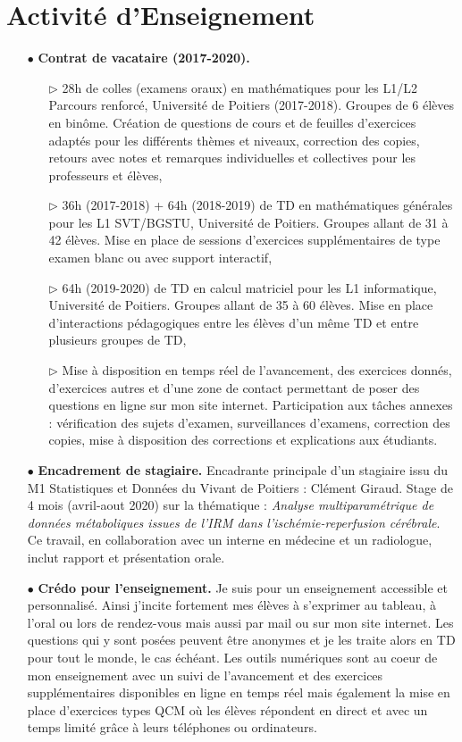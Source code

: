 \documentclass[a4paper, 12pt, twoside, openright]{article}
\begin{document}
\newpage
\section{Activité d'Enseignement}\label{ens}
\begin{itemize}
\item[\color{MagSombre}$\bullet$] \textbf{\color{MagSombre}Contrat de vacataire (2017-2020).}
\begin{itemize}
\item[$\triangleright$] 28h de colles (examens oraux) en mathématiques pour les L1/L2 Parcours renforcé, Université de Poitiers (2017-2018). Groupes de 6 élèves en binôme. Création de questions de cours et de feuilles d'exercices adaptés pour les différents thèmes et niveaux, correction des copies, retours avec notes et remarques individuelles et collectives pour les professeurs et élèves,
\item[$\triangleright$] 36h (2017-2018) + 64h (2018-2019) de TD en mathématiques générales pour les L1 SVT/BGSTU, Université de Poitiers. Groupes allant de 31 à 42 élèves. Mise en place de sessions d'exercices supplémentaires de type examen blanc ou avec support interactif, 
\item[$\triangleright$] 64h (2019-2020) de TD en calcul matriciel pour les L1 informatique, Université de Poitiers. Groupes allant de 35 à 60 élèves. Mise en place d'interactions pédagogiques entre les élèves d'un même TD et entre plusieurs groupes de TD,
\item[$\triangleright$] Mise à disposition en temps réel de l'avancement, des exercices donnés, d'exercices autres et d'une zone de contact permettant de poser des questions en ligne sur mon site internet. Participation aux tâches annexes : vérification des sujets d'examen, surveillances d'examens, correction des copies, mise à disposition des corrections et explications aux étudiants.
\end{itemize}
\item[\color{MagSombre}$\bullet$] \textbf{\color{MagSombre}Encadrement de stagiaire.} Encadrante principale d'un stagiaire issu du M1 Statistiques et Données du Vivant de Poitiers : Clément Giraud. Stage de 4 mois (avril-aout 2020) sur la thématique : \textit{Analyse multiparamétrique de données métaboliques issues de l'IRM dans l'ischémie-reperfusion cérébrale}. Ce travail, en collaboration avec un interne en médecine et un radiologue, inclut rapport et présentation orale.  
\item[\color{MagSombre}$\bullet$] \textbf{\color{MagSombre}Crédo pour l'enseignement.} Je suis pour un enseignement accessible et personnalisé. Ainsi j'incite fortement mes élèves à s'exprimer au tableau, à l'oral ou lors de rendez-vous mais aussi par mail ou sur mon site internet. Les questions qui y sont posées peuvent être anonymes et je les traite alors en TD pour tout le monde, le cas échéant. Les outils numériques sont au coeur de mon enseignement avec un suivi de l'avancement et des exercices supplémentaires disponibles en ligne en temps réel mais également la mise en place d'exercices types QCM où les élèves répondent en direct et avec un temps limité grâce à leurs téléphones ou ordinateurs.

\end{itemize}
\end{document}
